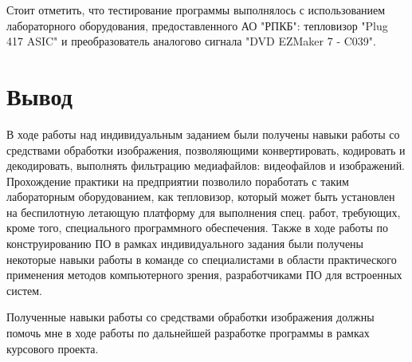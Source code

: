 	Стоит отметить, что тестирование программы выполнялось с использованием лабораторного оборудования, предоставленного АО "РПКБ": тепловизор "Plug 417 ASIC" и преобразователь аналогово сигнала "DVD EZMaker 7 - C039".

\section{Вывод}
	В ходе работы над индивидуальным заданием были получены навыки работы со средствами обработки изображения, позволяющими конвертировать, кодировать и декодировать, выполнять фильтрацию медиафайлов: видеофайлов и изображений. Прохождение практики на предприятии позволило поработать с таким лабораторным оборудованием, как тепловизор, который может быть установлен на беспилотную летающую платформу для выполнения спец. работ, требующих, кроме того, специального программного обеспечения. Также в ходе работы по конструированию ПО в рамках индивидуального задания были получены некоторые навыки работы в команде со специалистами в области практического применения методов компьютерного зрения, разработчиками ПО для встроенных систем.

	Полученные навыки работы со средствами обработки изображения должны помочь мне в ходе работы по дальнейшей разработке программы в рамках курсового проекта.
